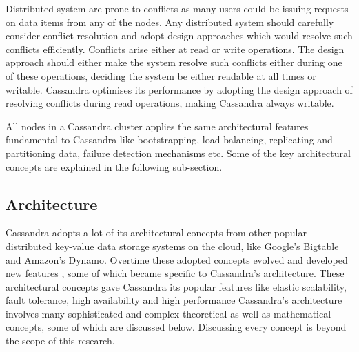 Distributed system are prone to conflicts as many users could be issuing
requests on data items from any of the nodes. Any distributed system should
carefully consider conflict resolution and adopt design approaches which would
resolve such conflicts efficiently. Conflicts arise either at read or write
operations.
The design approach should either make the system resolve such conflicts either
during one of these operations, deciding the system be either readable at all
times or writable. Cassandra optimises its performance by adopting the design
approach of resolving conflicts during read operations, making Cassandra always
writable.

All nodes in a Cassandra cluster applies the same architectural features
fundamental to Cassandra like bootstrapping, load balancing, replicating and
partitioning data, failure detection mechanisms etc. Some of the key
architectural concepts are explained in the following sub-section.



\subsection{Architecture} \label{ss:Cassandra-architecture}

Cassandra adopts a lot of its architectural concepts from other popular
distributed key-value data storage systems on the cloud, like Google's Bigtable
and Amazon's Dynamo. Overtime these adopted concepts evolved and developed new
features , some of which became specific to Cassandra's architecture. These
architectural concepts gave Cassandra its popular features like elastic
scalability, fault tolerance, high availability and high performance Cassandra's
architecture involves many sophisticated and complex theoretical as well as
mathematical concepts, some of which are discussed below. Discussing every
concept is beyond the scope of this research.




